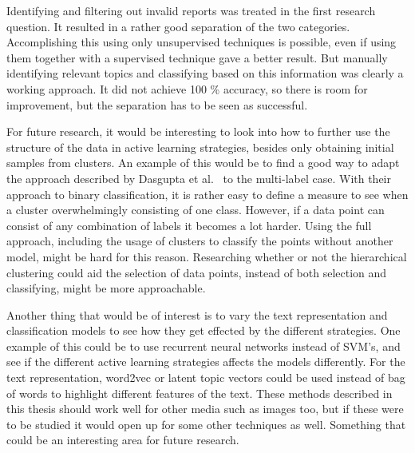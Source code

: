 Identifying and filtering out invalid reports was treated in the first research question.
It resulted in a rather good separation of the two categories.
Accomplishing this using only unsupervised techniques is possible, even if using them together with a supervised technique gave a better result.
But manually identifying relevant topics and classifying based on this information was clearly a working approach.
It did not achieve 100 \% accuracy, so there is room for improvement, but the separation has to be seen as successful.

For future research, it would be interesting to look into how to further use the structure of the data in active learning strategies, besides only obtaining initial samples from clusters.
An example of this would be to find a good way to adapt the approach described by Dasgupta et al\@.~\cite{dasgupta2008hierarchical} to the multi-label case.
With their approach to binary classification, it is rather easy to define a measure to see when a cluster overwhelmingly consisting of one class.
However, if a data point can consist of any combination of labels it becomes a lot harder.
Using the full approach, including the usage of clusters to classify the points without another model, might be hard for this reason.
Researching whether or not the hierarchical clustering could aid the selection of data points, instead of both selection and classifying, might be more approachable.

Another thing that would be of interest is to vary the text representation and classification models to see how they get effected by the different strategies.
One example of this could be to use recurrent neural networks instead of SVM's, and see if the different active learning strategies affects the models differently.
For the text representation, word2vec or latent topic vectors could be used instead of bag of words to highlight different features of the text.
These methods described in this thesis should work well for other media such as images too, but if these were to be studied it would open up for some other techniques as well.
Something that could be an interesting area for future research.